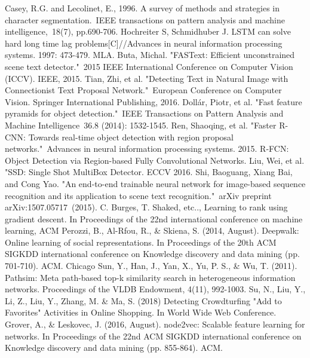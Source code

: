 \begin{thebibliography}{99}
 Casey, R.G. and Lecolinet, E., 1996. A survey of methods and strategies in character segmentation. IEEE transactions on pattern analysis and machine intelligence, 18(7), pp.690-706.
 Hochreiter S, Schmidhuber J. LSTM can solve hard long time lag problems[C]//Advances in neural information processing systems. 1997: 473-479.
MLA.	
Buta, Michal. "FASText: Efficient unconstrained scene text detector." 2015 IEEE International Conference on Computer Vision (ICCV). IEEE, 2015.
Tian, Zhi, et al. "Detecting Text in Natural Image with Connectionist Text Proposal Network." European Conference on Computer Vision. Springer International Publishing, 2016.
Dollár, Piotr, et al. "Fast feature pyramids for object detection." IEEE Transactions on Pattern Analysis and Machine Intelligence 36.8 (2014): 1532-1545.
Ren, Shaoqing, et al. "Faster R-CNN: Towards real-time object detection with region proposal networks." Advances in neural information processing systems. 2015.
 R-FCN: Object Detection via Region-based Fully Convolutional Networks.
 Liu, Wei, et al. "SSD: Single Shot MultiBox Detector. ECCV 2016.
 Shi, Baoguang, Xiang Bai, and Cong Yao. "An end-to-end trainable neural network for image-based sequence recognition and its application to scene text recognition." arXiv preprint arXiv:1507.05717 (2015).
 C. Burges, T. Shaked, etc.., Learning to rank 
using gradient descent. In Proceedings of the 22nd international 
conference on machine learning, ACM
 Perozzi, B., Al-Rfou, R., \& Skiena, S. (2014, August). Deepwalk: Online learning of social representations. In Proceedings of the 20th ACM SIGKDD international conference on Knowledge discovery and data mining (pp. 701-710). ACM.
Chicago	
Sun, Y., Han, J., Yan, X., Yu, P. S., \& Wu, T. (2011). Pathsim: Meta path-based top-k similarity search in heterogeneous information networks. Proceedings of the VLDB Endowment, 4(11), 992-1003.
Su, N., Liu, Y., Li, Z., Liu, Y., Zhang, M. \& Ma, S. (2018) Detecting Crowdturfing "Add to Favorites" Activities in Online Shopping. In World Wide Web Conference.
Grover, A., \& Leskovec, J. (2016, August). node2vec: Scalable feature learning for networks. In Proceedings of the 22nd ACM SIGKDD international conference on Knowledge discovery and data mining (pp. 855-864). ACM.

\end{thebibliography}
